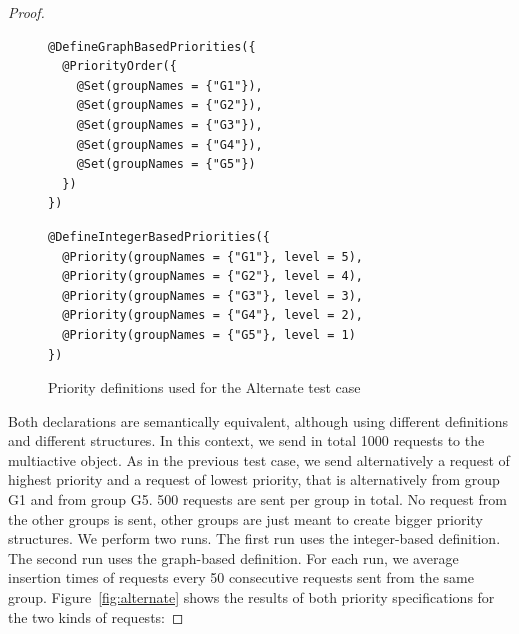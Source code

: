 \documentclass[11pt]{report}
\begin{document}
\begin{proof}
\begin{figure}[!ht]
	\lstset{language=java, numbers=left, numberstyle=\tiny, stepnumber=1, numbersep=5pt, basicstyle=\footnotesize}
	\begin{minipage}{0.41\textwidth}
	\begin{lstlisting}[frame=single]
@DefineGraphBasedPriorities({
  @PriorityOrder({
    @Set(groupNames = {"G1"}),
    @Set(groupNames = {"G2"}),
    @Set(groupNames = {"G3"}),
    @Set(groupNames = {"G4"}),
    @Set(groupNames = {"G5"})
  })
})
 	\end{lstlisting}
 	\end{minipage}
 	\hfill
	\begin{minipage}{0.55\textwidth}
	\begin{lstlisting}[frame=single]
@DefineIntegerBasedPriorities({
  @Priority(groupNames = {"G1"}, level = 5),
  @Priority(groupNames = {"G2"}, level = 4),
  @Priority(groupNames = {"G3"}, level = 3),
  @Priority(groupNames = {"G4"}, level = 2),
  @Priority(groupNames = {"G5"}, level = 1)
})
 	\end{lstlisting}
 	\end{minipage}	
	\caption{Priority definitions used for the Alternate test case}
	\label{fig:alternate-decl}
\end{figure}

Both declarations are semantically equivalent, although using different definitions and different structures. In this context, we send in total 1000 requests to the multiactive object. As in the previous test case, we send alternatively a request of highest priority and a request of lowest priority, that is alternatively from group G1 and from group G5. 500 requests are sent per group in total. No request from the other groups is sent, other groups are just meant to create bigger priority structures. We perform two runs. The first run uses the integer-based definition. The second run uses the graph-based definition. For each run, we average insertion times of requests every 50 consecutive requests sent from the same group. Figure~\ref{fig:alternate} shows the results of both priority specifications for the two kinds of requests:


\end{proof}
\end{document}
